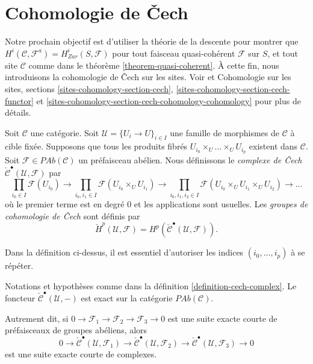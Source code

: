 \section{Cohomologie de {\v C}ech}
\label{section-cech-cohomology}

\noindent
Notre prochain objectif est d'utiliser la th\'eorie de la descente pour montrer que
$H^i(\mathcal{C}, \mathcal{F}^a) = H_{Zar}^i(S, \mathcal{F})$
pour tout faisceau quasi-coh\'erent $\mathcal{F}$ sur $S$, et
tout site $\mathcal{C}$ comme dans le th\'eor\`eme \ref{theorem-quasi-coherent}.
\`A cette fin, nous introduisons la cohomologie de {\v C}ech sur les sites.
Voir \cite{ArtinTopologies} et
Cohomologie sur les sites, sections \ref{sites-cohomology-section-cech},
\ref{sites-cohomology-section-cech-functor}
et \ref{sites-cohomology-section-cech-cohomology-cohomology}
pour plus de d\'etails.

\begin{definition}
\label{definition-cech-complex}
Soit $\mathcal{C}$ une cat\'egorie. Soit
$\mathcal{U} = \{U_i \to U\}_{i \in I}$ une famille de morphismes de
$\mathcal{C}$ \`a cible fix\'ee. Supposons que tous les produits fibr\'es
$U_{i_0} \times_U \ldots \times_U U_{i_p}$ existent dans $\mathcal{C}$.
Soit $\mathcal{F} \in \textit{PAb}(\mathcal{C})$ un
pr\'efaisceau ab\'elien. Nous d\'efinissons le {\it complexe de {\v C}ech}
$\check{\mathcal{C}}^\bullet(\mathcal{U}, \mathcal{F})$ par
$$
\prod_{i_0 \in I} \mathcal{F}(U_{i_0}) \to
\prod_{i_0, i_1 \in I} \mathcal{F}(U_{i_0} \times_U U_{i_1}) \to
\prod_{i_0, i_1, i_2 \in I}
\mathcal{F}(U_{i_0} \times_U U_{i_1} \times_U U_{i_2}) \to \ldots
$$
o\`u le premier terme est en degr\'e 0 et les applications sont usuelles.
Les {\it groupes de cohomologie de {\v C}ech} sont d\'efinis par
$$
\check{H}^p(\mathcal{U}, \mathcal{F}) =
H^p(\check{\mathcal{C}}^\bullet(\mathcal{U}, \mathcal{F})).
$$
\end{definition}

\noindent
Dans la d\'efinition ci-dessus, il est essentiel d'autoriser les indices
$(i_0, \ldots, i_p)$ \`a se r\'ep\'eter.

\begin{lemma}
\label{lemma-cech-presheaves}
Notations et hypoth\`eses comme dans la d\'efinition \ref{definition-cech-complex}.
Le foncteur $\check{\mathcal{C}}^\bullet(\mathcal{U}, -)$
est exact sur la cat\'egorie $\textit{PAb}(\mathcal{C})$.
\end{lemma}

\noindent
Autrement dit, si $0\to \mathcal{F}_1\to \mathcal{F}_2\to \mathcal{F}_3\to 0$
est une suite exacte courte de pr\'efaisceaux de groupes ab\'eliens, alors
$$
0 \to \check{\mathcal{C}}^\bullet\left(\mathcal{U}, \mathcal{F}_1\right)
\to\check{\mathcal{C}}^\bullet(\mathcal{U}, \mathcal{F}_2) \to
\check{\mathcal{C}}^\bullet(\mathcal{U}, \mathcal{F}_3)\to 0
$$
est une suite exacte courte de complexes.

